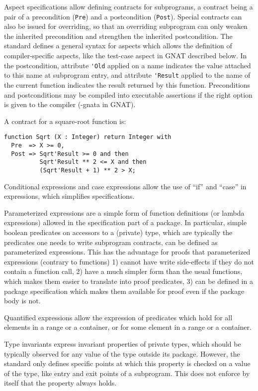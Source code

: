 \documentclass{article}
\newcounter{example}
\newenvironment{example}[1][EXAMPLE \theexample]{%
\par
\refstepcounter{example}%
\SpecialEnv{#1}{exampleborder}{examplebg}{}{\theexample}%
}{%
\endSpecialEnv
}
\begin{document}
Aspect specifications allow defining contracts for subprograms, a contract
being a pair of a precondition (\verb|Pre|) and a postcondition
(\verb|Post|). Special contracts can also be issued for overriding, so that an
overriding subprogram can only weaken the inherited precondition and strengthen
the inherited postcondition. The standard defines a general syntax for aspects
which allows the definition of compiler-specific aspects, like the test-case
aspect in GNAT described below. In the postcondition, attribute \verb|'Old|
applied on a name indicates the value attached to this name at subprogram
entry, and attribute \verb|'Result| applied to the name of the current function
indicates the result returned by this function. Preconditions and
postconditions may be compiled into executable assertions if the right option
is given to the compiler (-gnata in GNAT).

\begin{example}
A contract for a square-root function is:
\begin{verbatim}
function Sqrt (X : Integer) return Integer with
  Pre  => X >= 0,
  Post => Sqrt'Result >= 0 and then
          Sqrt'Result ** 2 <= X and then
          (Sqrt'Result + 1) ** 2 > X;
\end{verbatim}
\end{example}

Conditional expressions and case expressions allow the use of ``if'' and
``case'' in expressions, which simplifies specifications.

Parameterized expressions are a simple form of function definitions (or lambda
expressions) allowed in the specification part of a package. In particular,
simple boolean predicates on accessors to a (private) type, which are typically
the predicates one needs to write subprogram contracts, can be defined as
parameterized expressions. This has the advantage for proofs that parameterized
expressions (contrary to functions) 1) cannot have write side-effects if they
do not contain a function call, 2) have a much simpler form than the usual
functions, which makes them easier to translate into proof predicates, 3) can
be defined in a package specification which makes them available for proof even
if the package body is not.

Quantified expressions allow the expression of predicates which hold for all
elements in a range or a container, or for some element in a range or a
container.

Type invariants express invariant properties of private types, which should be
typically observed for any value of the type outside its package. However, the
standard only defines specific points at which this property is checked on a
value of the type, like entry and exit points of a subprogram. This does not
enforce by itself that the property always holds.
\end{document}
